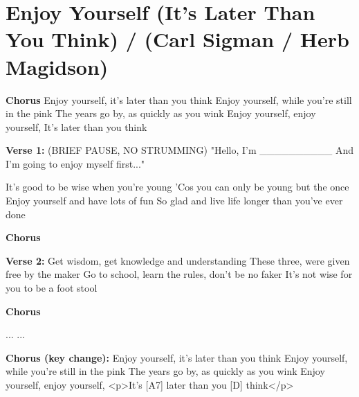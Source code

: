 \section{Enjoy Yourself (It's Later Than You Think) / (Carl Sigman / Herb Magidson)}\label{sec:enjoy_yourself_(it_s_later_than_you_think)}

\textbf{Chorus}
Enjoy yourself, it's later than you think
Enjoy yourself, while you're still in the pink
The years go by, as quickly as you wink
Enjoy yourself, enjoy yourself,
It's later than you think

\textbf{Verse 1:}
(BRIEF PAUSE, NO STRUMMING)
"Hello, I'm __________
And I'm going to enjoy myself first..."

It's good to be wise when you're young
'Cos you can only be young but the once
Enjoy yourself and have lots of fun
So glad and live life longer than you've ever 
done

\textbf{Chorus}

\textbf{Verse 2:}
Get wisdom, get knowledge and understanding
These three, were given free by the maker
Go to school, learn the rules, don't be no faker
It's not wise for you to be a foot stool

\textbf{Chorus}

...      ...

\textbf{Chorus (key change):}
Enjoy yourself, it's later than you think
Enjoy yourself, while you're still in the pink
The years go by, as quickly as you wink
Enjoy yourself, enjoy yourself,
<p>It's [A7] later than you [D] think</p>
